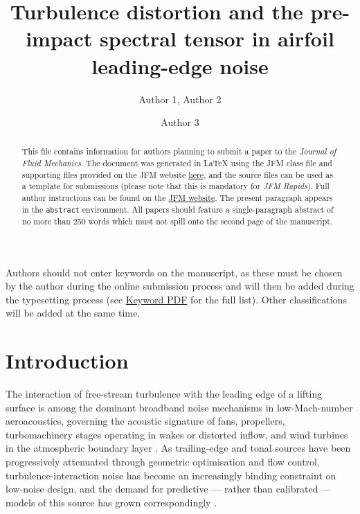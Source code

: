 \documentclass[lineno]{JFM-FLM_Au}
\title{Turbulence distortion and the pre-impact spectral tensor in airfoil leading-edge noise}
\author{Author 1\aff{1}, Author 2\aff{1} \and Author 3\aff{2}}
\affiliation{\aff{1}Department, Institution, City, Country
\aff{2}Department, Institution, City, Country}
\begin{document}
\maketitle

\begin{abstract}
This file contains information for authors planning to submit a paper to the {\it Journal of Fluid Mechanics}. The document was generated in {\LaTeX} using the JFM class file and supporting files provided on the JFM website \href{https://www.cambridge.org/core/journals/journal-of-fluid-mechanics/information/author-instructions/preparing-your-materials}{here}, and the source files can be used as a template for submissions (please note that this is mandatory for {\it JFM Rapids}). Full author instructions can be found on the \href{https://www.cambridge.org/core/journals/journal-of-fluid-mechanics/information/author-instructions}{JFM website}. The present paragraph appears in the \verb}abstract} environment. All papers should feature a single-paragraph abstract of no more than 250 words which must not spill onto the second page of the manuscript.
\end{abstract}

\begin{keywords}
Authors should not enter keywords on the manuscript, as these must be chosen by the author during the online submission process and will then be added during the typesetting process (see \href{https://www.cambridge.org/core/services/aop-file-manager/file/61436b61ff7f3cfab749ce3a/JFM-Keywords-Sept-2021.pdf.}{Keyword PDF} for the full list).  Other classifications will be added at the same time.
\end{keywords}



\section{Introduction}
\label{sec:introduction}

The interaction of free-stream turbulence with the leading edge of a lifting
surface is among the dominant broadband noise mechanisms in low-Mach-number
aeroacoustics, governing the acoustic signature of fans, propellers,
turbomachinery stages operating in wakes or distorted inflow, and wind
turbines in the atmospheric boundary layer
\citep{Amiet1975,PatersonAmiet1976,Moriarty2005,DevenportStaubsGlegg2010}.
As trailing-edge and tonal sources have been progressively attenuated through
geometric optimisation and flow control, turbulence-interaction noise has
become an increasingly binding constraint on low-noise design, and the demand
for predictive — rather than calibrated — models of this source has grown
correspondingly \citep{KimHaeriJoseph2016,SharmaSarradjSchmidt2020,SharmaHerr2024}.
\end{document}
